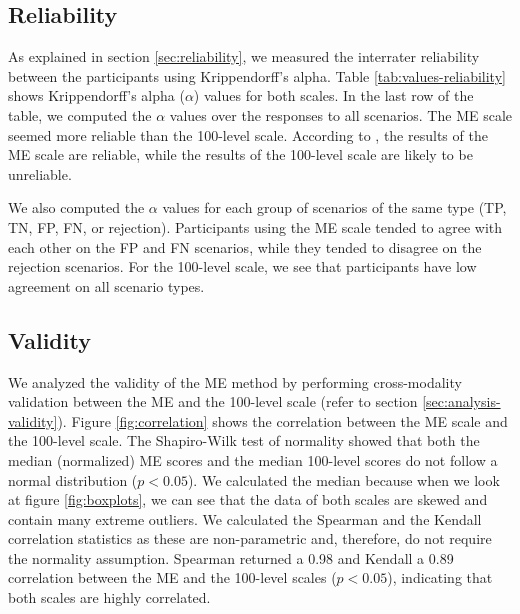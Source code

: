 \subsection{Reliability}
\label{sec:results-reliability}
As explained in section \ref{sec:reliability}, we measured the interrater reliability between the participants using Krippendorff's alpha.
%
Table \ref{tab:values-reliability} shows Krippendorff's alpha ($\alpha$) values for both scales.
%
In the last row of the table, we computed the $\alpha$ values over the responses to all scenarios.
%
The ME scale seemed more reliable than the 100-level scale.
%
According to \citet{krippendorff2004reliability}, the results of the ME scale are reliable, while the results of the 100-level scale are likely to be unreliable.
%

%
We also computed the $\alpha$ values for each group of scenarios of the same type (TP, TN, FP, FN, or rejection).
%
Participants using the ME scale tended to agree with each other on the FP and FN scenarios, while they tended to disagree on the rejection scenarios.
%
For the 100-level scale, we see that participants have low agreement on all scenario types.

\subsection{Validity}
\label{sec:results-validity}
We analyzed the validity of the ME method by performing cross-modality validation between the ME and the 100-level scale (refer to section \ref{sec:analysis-validity}).
%
Figure \ref{fig:correlation} shows the correlation between the ME scale and the 100-level scale.
%
The Shapiro-Wilk test of normality showed that both the median (normalized) ME scores and the median 100-level scores do not follow a normal distribution ($p < 0.05$).
%
We calculated the median because when we look at figure \ref{fig:boxplots}, we can see that the data of both scales are skewed and contain many extreme outliers.
% 
We calculated the Spearman and the Kendall correlation statistics as these are non-parametric and, therefore, do not require the normality assumption.
%
Spearman returned a 0.98 and Kendall a 0.89 correlation between the ME and the 100-level scales ($p < 0.05$), indicating that both scales are highly correlated.

